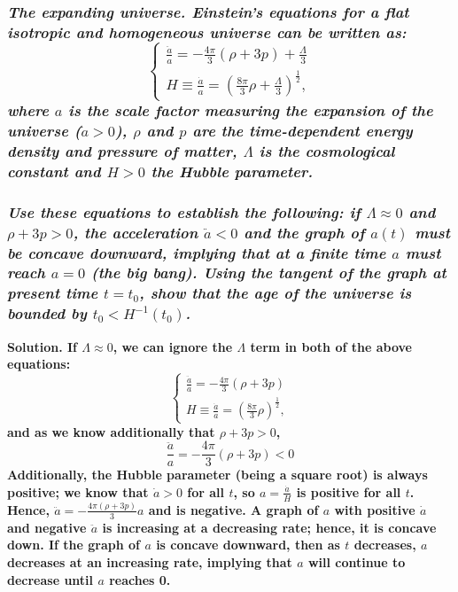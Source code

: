 \documentclass{article}
\begin{document}
\subsubsection*{\it The expanding universe. \bf Einstein's equations for a flat isotropic and homogeneous universe can be written as: 
\begin{equation*}
    \begin{cases}
        \frac{\ddot{a}}{a}=-\frac{4\pi}{3}(\rho+3p)+\frac{\Lambda}{3}\\
        H\equiv \frac{\dot{a}}{a} = (\frac{8\pi}{3}\rho + \frac{\Lambda}{3})^{\frac{1}{2}},
    \end{cases}
\end{equation*}
where $a$ is the scale factor measuring the expansion of the universe ($\dot{a}>0$), $\rho$ and $p$ are the time-dependent energy density and pressure of matter, $\Lambda$ is the cosmological constant and $H>0$ the Hubble parameter. \\ \\
Use these equations to establish the following: if $\Lambda \approx 0$ and $\rho+3p>0$, the acceleration $\ddot{a}<0$ and the graph of $a(t)$ must be concave downward, implying that at a finite time $a$ must reach $a=0$ (the big bang). Using the tangent of the graph at present time $t=t_0$, show that the age of the universe is bounded by $t_0<H^{-1}(t_0)$.}
\bf Solution. \normalfont If $\Lambda \approx 0$, we can ignore the $\Lambda$ term in both of the above equations:
\begin{equation*}
    \begin{cases}
        \frac{\ddot{a}}{a}=-\frac{4\pi}{3}(\rho+3p)\\
        H\equiv \frac{\dot{a}}{a} = (\frac{8\pi}{3}\rho)^{\frac{1}{2}},
    \end{cases}
\end{equation*}
and as we know additionally that $\rho+3p>0$,
\begin{equation*}
    \frac{\ddot{a}}{a}=-\frac{4\pi}{3}(\rho+3p)<0
\end{equation*}
Additionally, the Hubble parameter (being a square root) is always positive; we know that $\dot{a}>0$ for all $t$, so $a=\frac{\dot{a}}{H}$ is positive for all $t$. Hence, $\ddot{a}=-\frac{4\pi(\rho+3p)}{3} a$ and is negative. A graph of $a$ with positive $\dot{a}$ and negative $\ddot{a}$ is increasing at a decreasing rate; hence, it is concave down. If the graph of $a$ is concave downward, then as $t$ decreases, $a$ decreases at an increasing rate, implying that $a$ will continue to decrease until $a$ reaches 0. \\ \\
\end{document}
